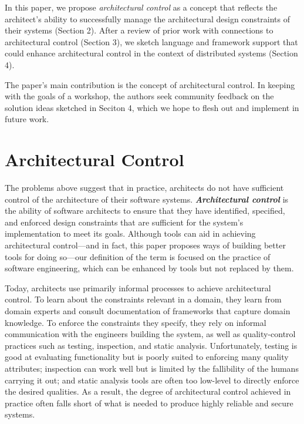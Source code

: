 \documentclass[runningheads]{llncs}
\begin{document}
\begin{sloppypar}
In this paper, we propose \emph{architectural control} as a concept that reflects the architect's ability to successfully manage the architectural design constraints of their systems (Section 2).  After a review of prior work with connections to architectural control (Section 3), we sketch language and framework support that could enhance architectural control in the context of distributed systems (Section 4).

The paper's main contribution is the concept of architectural control.  In keeping with the goals of a workshop, the authors seek community feedback on the solution ideas sketched in Seciton 4, which we hope to flesh out and implement in future work.


\section{Architectural Control}

The problems above suggest that in practice, architects do not have sufficient control of the architecture of their software systems.  \emph{\textbf{Architectural control}} is the ability of software architects to ensure that they have identified, specified, and enforced design constraints that are sufficient for the system's implementation to meet its goals.  Although tools can aid in achieving architectural control---and in fact, this paper proposes ways of building better tools for doing so---our definition of the term is focused on the practice of software engineering, which can be enhanced by tools but not replaced by them.

Today, architects use primarily informal processes to achieve architectural control.  To learn about the constraints relevant in a domain, they learn from domain experts and consult documentation of frameworks that capture domain knowledge.  To enforce the constraints they specify, they rely on informal communication with the engineers building the system, as well as quality-control practices such as testing, inspection, and static analysis.  Unfortunately, testing is good at evaluating functionality but is poorly suited to enforcing many quality attributes; inspection can work well but is limited by the fallibility of the humans carrying it out; and static analysis tools are often too low-level to directly enforce the desired qualities.  As a result, the degree of architectural control achieved in practice often falls short of what is needed to produce highly reliable and secure systems.



\end{sloppypar}
\end{document}
